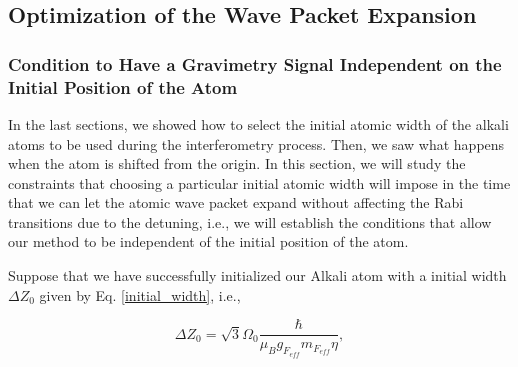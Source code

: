 \documentclass{article}
\begin{document}

\subsection{Optimization of the Wave Packet Expansion}
\subsubsection{Condition to Have a Gravimetry Signal Independent on the Initial Position of the Atom}
In the last sections, we showed how to select the initial atomic width of the alkali atoms to be used during the interferometry process. Then, we saw what happens when the atom is shifted from the origin. In this section, we will study the constraints that choosing a particular initial atomic width will impose in the time that we can let the atomic wave packet expand without affecting the Rabi transitions due to the detuning, i.e., we will establish the conditions that allow our method to be independent of the initial position of the atom.

Suppose that we have successfully initialized our Alkali atom with a initial width $\Delta Z_{0}$ given by Eq. \ref{initial_width}, i.e.,

\begin{equation}\label{initial_width_in_terms_of_rabi}
\Delta Z_{0} = \sqrt{3} \Omega_{0} \frac{\hbar}{\mu_{B} g_{F_{eff}} m_{F_{eff}} \eta},
\end{equation}
\end{document}
